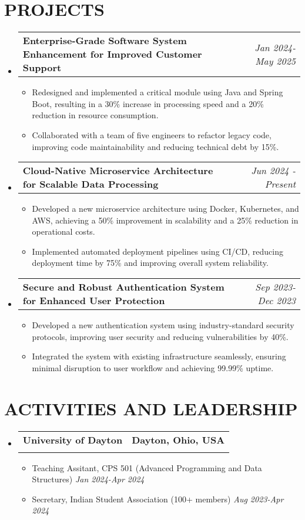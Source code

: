 \documentclass[letterpaper,11pt]{article}
\makeatletter
\newcommand{\resumeItem}[1]{\item\small{{#1 \vspace{-2pt}}}}
\newcommand{\resumeSubheading}[4]{\vspace{-2pt}\item\begin{tabular*}{0.97\textwidth}[t]{l@{\extracolsep{\fill}}r}\textbf{#1} & #2 \\\textit{\small#3} & \textit{\small #4} \\\end{tabular*}\vspace{-7pt}}
\newcommand{\resumeProjectHeading}[2]{\item\begin{tabular*}{0.97\textwidth}{l@{\extracolsep{\fill}}r}\small#1 & #2 \\\end{tabular*}\vspace{-7pt}}
\newcommand{\resumeSubHeadingListStart}{\begin{itemize}[leftmargin=0.15in, label={}]}
\newcommand{\resumeSubHeadingListEnd}{\end{itemize}}
\newcommand{\resumeItemListStart}{\begin{itemize}}
\newcommand{\resumeItemListEnd}{\end{itemize}\vspace{-5pt}}
\makeatother
\begin{document}
\section{{\fontsize{9pt}{20pt}\selectfont \textbf{PROJECTS}}}
\resumeSubHeadingListStart
\resumeProjectHeading{\textbf{Enterprise-Grade Software System Enhancement for Improved Customer Support}}{\textit{Jan 2024-May 2025}}
\resumeItemListStart
\resumeItem{Redesigned and implemented a critical module using Java and Spring Boot, resulting in a 30\% increase in processing speed and a 20\% reduction in resource consumption.}
\resumeItem{Collaborated with a team of five engineers to refactor legacy code, improving code maintainability and reducing technical debt by 15\%.}
\resumeItemListEnd\vspace{-6pt}
\resumeProjectHeading{\textbf{Cloud-Native Microservice Architecture for Scalable Data Processing}}{\textit{Jun 2024 - Present}}
\resumeItemListStart
\resumeItem{Developed a new microservice architecture using Docker, Kubernetes, and AWS, achieving a 50\% improvement in scalability and a 25\% reduction in operational costs.}
\resumeItem{Implemented automated deployment pipelines using CI/CD, reducing deployment time by 75\% and improving overall system reliability.}
\resumeItemListEnd\vspace{-6pt}
\resumeProjectHeading{\textbf{Secure and Robust Authentication System for Enhanced User Protection}}{\textit{Sep 2023-Dec 2023}}
\resumeItemListStart
\resumeItem{Developed a new authentication system using industry-standard security protocols, improving user security and reducing vulnerabilities by 40\%.}
\resumeItem{Integrated the system with existing infrastructure seamlessly, ensuring minimal disruption to user workflow and achieving 99.99\% uptime.}
\resumeItemListEnd
\resumeSubHeadingListEnd
\vspace{-17pt}

\section{{\fontsize{9pt}{20pt}\selectfont \textbf{ACTIVITIES AND LEADERSHIP}}}
\resumeSubHeadingListStart
\resumeSubheading{University of Dayton}{\textbf{Dayton, Ohio, USA}}{}{}
\vspace{-17pt}
\resumeItemListStart
\resumeItem{Teaching Assitant, CPS 501 (Advanced Programming and Data Structures)} \hfill \textit{Jan 2024-Apr 2024}
\resumeItem{Secretary, Indian Student Association (100+ members)} \hfill \textit{Aug 2023-Apr 2024}
\resumeItemListEnd
\resumeSubHeadingListEnd
\vspace{-18pt}
\end{document}
